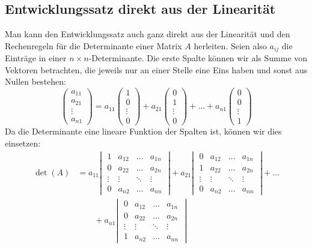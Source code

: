 \subsection{Entwicklungssatz direkt aus der Linearität}
Man kann den Entwicklungssatz auch ganz direkt aus der Linearität
und den Rechenregeln für die Determinante einer Matrix $A$ herleiten.
Seien also $a_{ij}$ die Einträge in einer $n\times n$-Determinante.
Die erste Spalte können wir als Summe von Vektoren betrachten,
die jeweils nur an einer Stelle eine Eins haben und sonst aus
Nullen bestehen:
\[
\begin{pmatrix}
a_{11}\\a_{21}\\\vdots\\a_{n1}
\end{pmatrix}
=
a_{11}\begin{pmatrix}1\\0\\\vdots\\0\end{pmatrix}
+
a_{21}\begin{pmatrix}0\\1\\\vdots\\0\end{pmatrix}
+
\dots
+
a_{n1}\begin{pmatrix}0\\0\\\vdots\\1\end{pmatrix}
\]
Da die Determinante eine lineare Funktion der Spalten ist,
können wir dies einsetzen:
\begin{align*}
\det(A)
&=
a_{11}
\left|\;
\begin{matrix}
1&a_{12}&\dots&a_{1n}\\
0&a_{22}&\dots&a_{2n}\\
\vdots&\vdots&\ddots&\vdots\\
0&a_{n2}&\dots&a_{nn}
\end{matrix}
\;\right|
+a_{21}
\left|\;
\begin{matrix}
0&a_{12}&\dots&a_{1n}\\
1&a_{22}&\dots&a_{2n}\\
\vdots&\vdots&\ddots&\vdots\\
0&a_{n2}&\dots&a_{nn}
\end{matrix}
\;\right|
+\dots
\\
&\qquad
+a_{n1}
\left|\;
\begin{matrix}
0&a_{12}&\dots&a_{1n}\\
0&a_{22}&\dots&a_{2n}\\
\vdots&\vdots&\ddots&\vdots\\
1&a_{n2}&\dots&a_{nn}
\end{matrix}
\;\right|
\end{align*}

